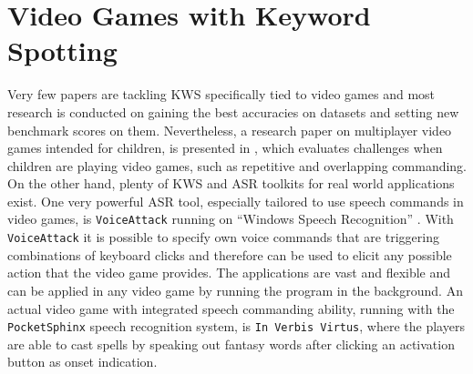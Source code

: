 
\section{Video Games with Keyword Spotting}\label{sec:prev_kws_games}
Very few papers are tackling KWS specifically tied to video games and most research is conducted on gaining the best accuracies on datasets and setting new benchmark scores on them.
Nevertheless, a research paper on multiplayer video games intended for children, is presented in \cite{Harshavardhan2015}, which evaluates challenges when children are playing video games, such as repetitive and overlapping commanding.
On the other hand, plenty of KWS and ASR toolkits for real world applications exist.
One very powerful ASR tool, especially tailored to use speech commands in video games, is \texttt{VoiceAttack} running on \enquote{Windows Speech Recognition} \cite{Xiong2017}.
With \texttt{VoiceAttack} it is possible to specify own voice commands that are triggering combinations of keyboard clicks and therefore can be used to elicit any possible action that the video game provides.
The applications are vast and flexible and can be applied in any video game by running the program in the background.
An actual video game with integrated speech commanding ability, running with the \texttt{PocketSphinx} \cite{Huggins2006} speech recognition system, is \texttt{In Verbis Virtus}, where the players are able to cast spells by speaking out fantasy words after clicking an activation button as onset indication.